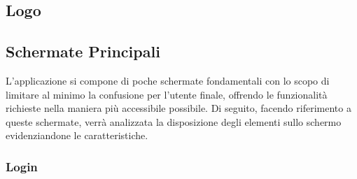 \documentclass[12pt,a4paper,twoside,openright,titlepage]{book}
\begin{document}
\subsection{Logo}
\subsection{Schermate Principali}
L'applicazione si compone di poche schermate fondamentali con lo scopo di limitare al minimo la confusione per l'utente finale, offrendo le funzionalità richieste nella maniera più accessibile possibile. Di seguito, facendo riferimento a queste schermate, verrà analizzata la disposizione degli elementi sullo schermo evidenziandone le caratteristiche.

\subsubsection{Login}
\end{document}
